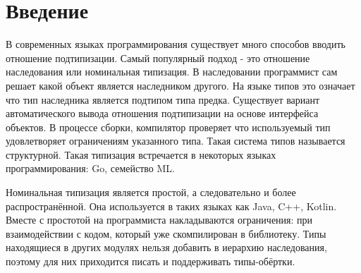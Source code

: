 \documentclass{spbau-diploma}
\begin{document}
\maketitle
\tableofcontents
\section*{Введение}
В современных языках программирования существует много способов вводить отношение подтипизации. Самый популярный подход - это отношение наследования или номинальная типизация. В наследовании программист сам решает какой объект является наследником другого. На языке типов это означает что тип наследника является подтипом типа предка. Существует вариант автоматического вывода отношения подтипизации на основе интерфейса объектов. В процессе сборки, компилятор проверяет что используемый тип удовлетворяет ограничениям указанного типа. Такая система типов называется структурной. Такая типизация встречается в некоторых языках программирования: Go, семейство ML.

Номинальная типизация является простой, а следовательно и более распространённой. Она используется в таких языках как Java, C++, Kotlin. Вместе с простотой на программиста накладываются ограничения: при взаимодействии с кодом, который уже скомпилирован в библиотеку. Типы находящиеся в других модулях нельзя добавить в иерархию наследования, поэтому для них приходится писать и поддерживать типы-обёртки.
\end{document}
